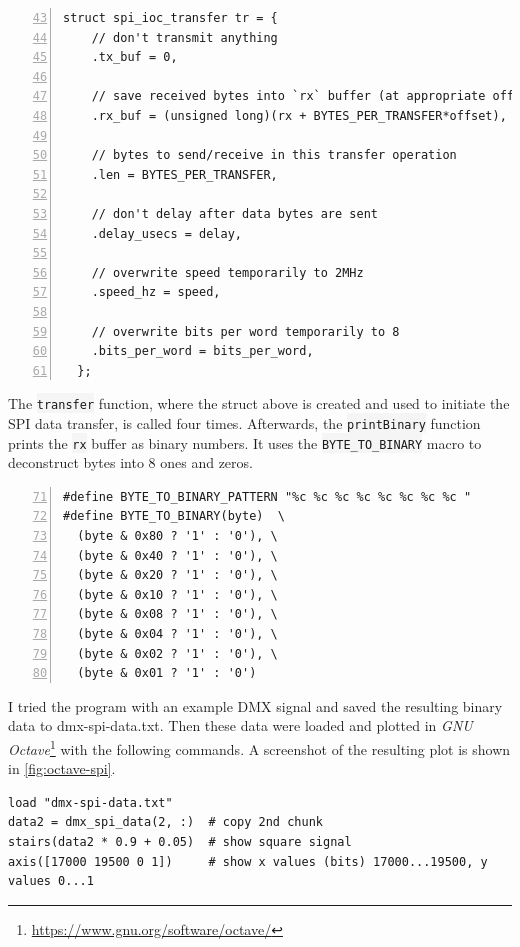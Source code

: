 \begin{lstlisting}[numbers=left, style=myCpp, firstnumber=43, caption={[Excerpt from \glsfont{spi-receive.c}]Excerpt from \gls{spi-receive.c}.}, label=lst:spi-receive]
  struct spi_ioc_transfer tr = {
    // don't transmit anything
    .tx_buf = 0,

    // save received bytes into `rx` buffer (at appropriate offset)
    .rx_buf = (unsigned long)(rx + BYTES_PER_TRANSFER*offset),

    // bytes to send/receive in this transfer operation
    .len = BYTES_PER_TRANSFER,

    // don't delay after data bytes are sent
    .delay_usecs = delay,

    // overwrite speed temporarily to 2MHz
    .speed_hz = speed,

    // overwrite bits per word temporarily to 8
    .bits_per_word = bits_per_word,
  };
\end{lstlisting}

The \colorbox{WhiteSmoke}{\lstinline!transfer!} function, where the struct above is created and
used to initiate the SPI data transfer, is called four times.
Afterwards, the \colorbox{WhiteSmoke}{\lstinline!printBinary!} function prints the
\colorbox{WhiteSmoke}{\lstinline!rx!} buffer as binary numbers. It uses the
\colorbox{WhiteSmoke}{\lstinline!BYTE_TO_BINARY!} macro to deconstruct bytes into 8 ones and
zeros.

\begin{lstlisting}[numbers=left, style=myCpp, firstnumber=71]
#define BYTE_TO_BINARY_PATTERN "%c %c %c %c %c %c %c %c "
#define BYTE_TO_BINARY(byte)  \
  (byte & 0x80 ? '1' : '0'), \
  (byte & 0x40 ? '1' : '0'), \
  (byte & 0x20 ? '1' : '0'), \
  (byte & 0x10 ? '1' : '0'), \
  (byte & 0x08 ? '1' : '0'), \
  (byte & 0x04 ? '1' : '0'), \
  (byte & 0x02 ? '1' : '0'), \
  (byte & 0x01 ? '1' : '0')
\end{lstlisting}

I
tried the program with an example DMX signal and saved the resulting
binary data to \gls{dmx-spi-data.txt}. Then these data were loaded and
plotted in \emph{GNU Octave}\footnote{\url{https://www.gnu.org/software/octave/}}
with the following commands. A screenshot of the resulting plot is shown
in \cref{fig:octave-spi}.

\begin{lstlisting}[style=myBash, morekeywords={load, stairs, axis}]
load "dmx-spi-data.txt"
data2 = dmx_spi_data(2, :)  # copy 2nd chunk
stairs(data2 * 0.9 + 0.05)  # show square signal
axis([17000 19500 0 1])     # show x values (bits) 17000...19500, y values 0...1
\end{lstlisting}

